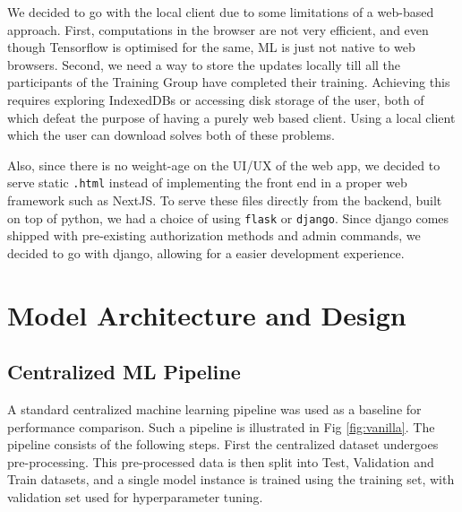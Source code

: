 \documentclass[10pt,twocolumn]{article}
\begin{document}
We decided to go with the local client due to some limitations of a web-based approach. First, computations in the browser are not very efficient, and even though Tensorflow is optimised for the same, ML is just not native to web browsers. Second, we need a way to store the updates locally till all the participants of the Training Group have completed their training. Achieving this requires exploring IndexedDBs or accessing disk storage of the user, both of which defeat the purpose of having a purely web based client. Using a local client which the user can download solves both of these problems.

Also, since there is no weight-age on the UI/UX of the web app, we decided to serve static \texttt{.html} instead of implementing the front end in a proper web framework such as NextJS. To serve these files directly from the backend, built on top of python, we had a choice of using \texttt{flask} or \texttt{django}. Since django comes shipped with pre-existing authorization methods and admin commands, we decided to go with django, allowing for a easier development experience. 

\section{Model Architecture and Design}

\subsection{Centralized ML Pipeline}
A standard centralized machine learning pipeline was used as a baseline for performance comparison. Such a pipeline is illustrated in Fig \ref{fig:vanilla}. The pipeline consists of the following steps. First the centralized dataset undergoes pre-processing. This pre-processed data is then split into Test, Validation and Train datasets, and a single model instance is trained using the training set, with validation set used for hyperparameter tuning. 
\end{document}
